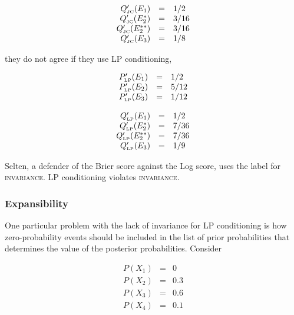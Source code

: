 \documentclass[12pt]{article}
\begin{document}
\begin{equation}
  \label{eq:marpleposteriorjc}
  \begin{array}{rcl}
  Q'_{\mbox{\tiny JC}}(E_{1})&=&1/2\\
  Q'_{\mbox{\tiny JC}}(E_{2}^{*})&=&3/16\\
  Q'_{\mbox{\tiny JC}}(E_{2}^{**})&=&3/16\\
  Q'_{\mbox{\tiny JC}}(E_{3})&=&1/8
\end{array}
\end{equation}

they do not agree if they use LP conditioning,

\begin{equation}
  \label{eq:sherlockposteriorlp}
  \begin{array}{rcl}
  P'_{\mbox{\tiny LP}}(E_{1})&=&1/2\\
  P'_{\mbox{\tiny LP}}(E_{2})&=&5/12\\
  P'_{\mbox{\tiny LP}}(E_{3})&=&1/12
\end{array}
\end{equation}

\begin{equation}
  \label{eq:marpleposteriorlp}
  \begin{array}{rcl}
  Q'_{\mbox{\tiny LP}}(E_{1})&=&1/2\\
  Q'_{\mbox{\tiny LP}}(E_{2}^{*})&=&7/36\\
  Q'_{\mbox{\tiny LP}}(E_{2}^{**})&=&7/36\\
  Q'_{\mbox{\tiny LP}}(E_{3})&=&1/9
\end{array}
\end{equation}

Selten, a defender of the Brier score against the Log score, uses the
label  for \textsc{invariance}. LP
conditioning violates \textsc{invariance}.

\subsubsection{Expansibility}
\label{Expansibility}

One particular problem with the lack of invariance for LP conditioning
is how zero-probability events should be included in the list of prior
probabilities that determines the value of the posterior
probabilities. Consider

\begin{equation}
  \label{eq:reginvone}
  \begin{array}{rcl}
  P(X_{1})&=&0\\
  P(X_{2})&=&0.3\\
  P(X_{3})&=&0.6\\
  P(X_{4})&=&0.1\\
\end{array}
\end{equation}
\end{document}

